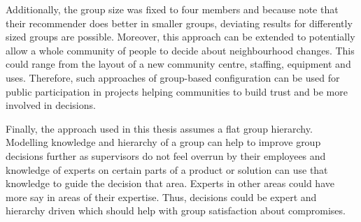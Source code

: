 Additionally, the group size was fixed to four members and because \citeauthor{choudharyMulticriteriaGroupRecommender2020} note that their recommender does better in smaller groups, deviating results for differently sized groups are possible. Moreover, this approach can be extended to potentially allow a whole community of people to decide about neighbourhood changes. This could range from the layout of a new community centre, staffing, equipment and uses. Therefore, such approaches of group-based configuration can be used for public participation in projects helping communities to build trust and be more involved in decisions.

Finally, the approach used in this thesis assumes a flat group hierarchy. Modelling knowledge and hierarchy of a group can help to improve group decisions further as supervisors do not feel overrun by their employees and knowledge of experts on certain parts of a product or solution can use that knowledge to guide the decision that area. Experts in other areas could have more say in areas of their expertise. Thus, decisions could be expert and hierarchy driven which should help with group satisfaction about compromises.